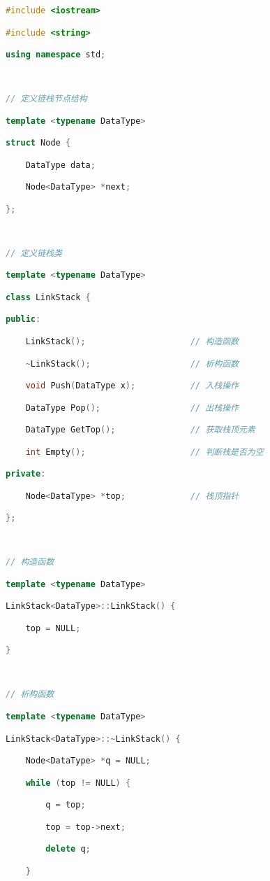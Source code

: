 \begin{lstlisting}[language=C++]
#include <iostream>

#include <string>

using namespace std;

  

// 定义链栈节点结构

template <typename DataType>

struct Node {

    DataType data;

    Node<DataType> *next;

};

  

// 定义链栈类

template <typename DataType>

class LinkStack {

public:

    LinkStack();                     // 构造函数

    ~LinkStack();                    // 析构函数

    void Push(DataType x);           // 入栈操作

    DataType Pop();                  // 出栈操作

    DataType GetTop();               // 获取栈顶元素

    int Empty();                     // 判断栈是否为空

private:

    Node<DataType> *top;             // 栈顶指针

};

  

// 构造函数

template <typename DataType>

LinkStack<DataType>::LinkStack() {

    top = NULL;

}

  

// 析构函数

template <typename DataType>

LinkStack<DataType>::~LinkStack() {

    Node<DataType> *q = NULL;

    while (top != NULL) {

        q = top;

        top = top->next;

        delete q;

    }


\end{lstlisting}
